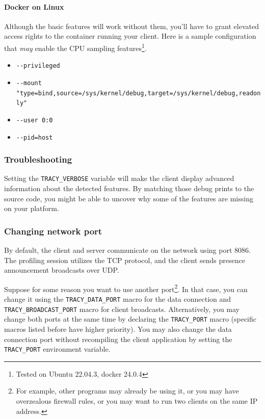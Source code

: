 \documentclass[hidelinks,titlepage,a4paper,twoside]{article}
\begin{document}
\paragraph{Docker on Linux}

Although the basic features will work without them, you'll have to grant elevated access rights to the container running your client. Here is a sample configuration that \textit{may} enable the CPU sampling features\footnote{Tested on Ubuntu 22.04.3, docker 24.0.4}.
\begin{itemize}
    \item \texttt{-{}-privileged}
    \item \texttt{-{}-mount "type=bind,source=/sys/kernel/debug,target=/sys/kernel/debug,readonly"}
    \item \texttt{-{}-user 0:0}
    \item \texttt{-{}-pid=host}
\end{itemize}

\subsubsection{Troubleshooting}

Setting the \texttt{TRACY\_VERBOSE} variable will make the client display advanced information about the detected features. By matching those debug prints to the source code, you might be able to uncover why some of the features are missing on your platform.

\subsubsection{Changing network port}

By default, the client and server communicate on the network using port 8086. The profiling session utilizes the TCP protocol, and the client sends presence announcement broadcasts over UDP.

Suppose for some reason you want to use another port\footnote{For example, other programs may already be using it, or you may have overzealous firewall rules, or you may want to run two clients on the same IP address.}. In that case, you can change it using the \texttt{TRACY\_DATA\_PORT} macro for the data connection and \texttt{TRACY\_BROADCAST\_PORT} macro for client broadcasts. Alternatively, you may change both ports at the same time by declaring the \texttt{TRACY\_PORT} macro (specific macros listed before have higher priority). You may also change the data connection port without recompiling the client application by setting the \texttt{TRACY\_PORT} environment variable.
\end{document}
